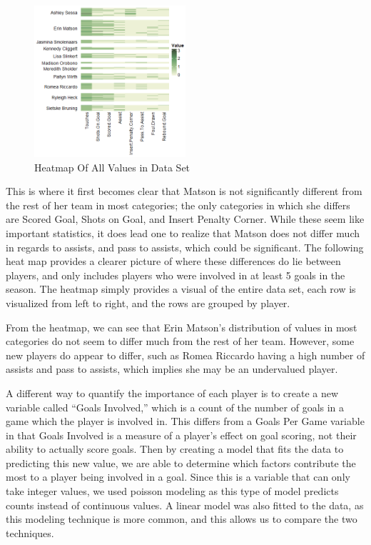 \documentclass{article} %
\begin{document}
\begin{figure}
	\centering
	\vspace{-0.5cm}
	\includegraphics[width=0.5\textwidth]{Heatmap}
	\caption{Heatmap Of All Values in Data Set}
	\label{fig :img2}
\end{figure}
This is where it first becomes clear that Matson is not significantly different from the rest of her team in most categories; the only categories in which she differs are Scored Goal, Shots on Goal, and Insert Penalty Corner. While these seem like important statistics, it does lead one to realize that Matson does not differ much in regards to assists, and pass to assists, which could be significant. The following heat map provides a clearer picture of where these differences do lie between players, and only includes players who were involved in at least 5 goals in the season. The heatmap simply provides a visual of the entire data set, each row is visualized from left to right, and the rows are grouped by player.



From the heatmap, we can see that Erin Matson’s distribution of values in most categories do not seem to differ much from the rest of her team. However, some new players do appear to differ, such as Romea Riccardo having a high number of assists and pass to assists, which implies she may be an undervalued player.

A different way to quantify the importance of each player is to create a new variable called “Goals Involved,” which is a count of the number of goals in a game which the player is involved in. This differs from a Goals Per Game variable in  that Goals Involved is a measure of a player’s effect on goal scoring, not their ability to actually score goals. Then by creating a model that fits the data to predicting this new value, we are able to determine which factors contribute the most to a player being involved in a goal. Since this is a variable that can only take integer values, we used poisson modeling as this type of model predicts counts instead of continuous values. A linear model was also fitted to the data, as this modeling technique is more common, and this allows us to compare the two techniques.
\end{document}
